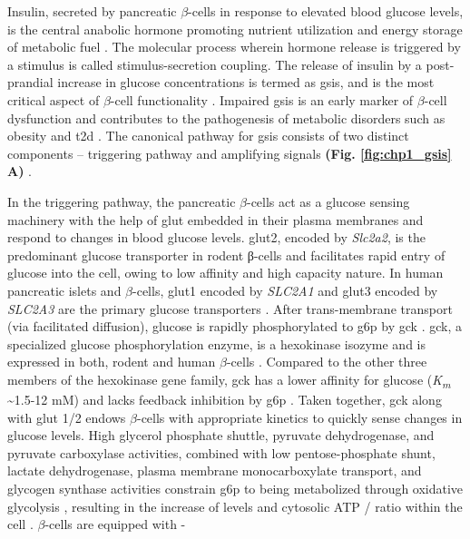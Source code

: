 Insulin, secreted by pancreatic $\beta$-cells in response to elevated blood glucose levels, is the central anabolic hormone promoting nutrient utilization and energy storage of metabolic fuel \textbf{\cite{slack_developmental_1995}}. The molecular process wherein hormone release is triggered by a stimulus is called stimulus-secretion coupling.  The release of insulin by a post-prandial increase in glucose concentrations is termed as \gls{gsis}, and is the most critical aspect of $\beta$-cell functionality \textbf{\cite{ashcroft_stimulussecretion_1994}}.  Impaired \gls{gsis} is an early marker of $\beta$-cell dysfunction and contributes to the pathogenesis of metabolic disorders such as obesity and \gls{t2d} \textbf{\cite{jensen_metabolic_2008}}. The canonical pathway for \gls{gsis} consists of two distinct components – triggering pathway and amplifying signals \textbf{(Fig. \ref{fig:chp1_gsis} A)} \textbf{\cite{henquin_triggering_2000}}. 
\\
\par In the triggering pathway, the pancreatic $\beta$-cells act as a glucose sensing machinery with the help of \gls{glut} embedded in their plasma membranes and respond to changes in blood glucose levels. \gls{glut}2, encoded by \textit{Slc2a2}, is the predominant glucose transporter in rodent β-cells \textbf{\cite{mcculloch_glut2_2011,van_de_bunt_tale_2012}} and facilitates rapid entry of glucose into the cell, owing to low affinity and high capacity nature. In human pancreatic islets and $\beta$-cells, \gls{glut}1 encoded by \textit{SLC2A1} and \gls{glut}3 encoded by \textit{SLC2A3} are the primary glucose transporters \textbf{\cite{mcculloch_glut2_2011}}. After trans-membrane transport (via facilitated diffusion), glucose is rapidly phosphorylated to \gls{g6p} by \gls{gck} \textbf{\cite{campbell_mechanisms_2021,matschinsky_central_2019}}. \gls{gck}, a specialized glucose phosphorylation enzyme, is a hexokinase isozyme and is expressed in both, rodent and human $\beta$-cells \textbf{\cite{campbell_mechanisms_2021}}. Compared to the other three members of the hexokinase gene family, \gls{gck} has a lower affinity for glucose (\textit{K\textsubscript{m}} \textasciitilde 1.5-12 mM) and lacks feedback inhibition by \gls{g6p} \textbf{\cite{matschinsky_central_2019}}. Taken together, \gls{gck} along with \gls{glut} 1/2 endows $\beta$-cells with appropriate kinetics to quickly sense changes in glucose levels. High glycerol phosphate shuttle, pyruvate dehydrogenase, and pyruvate carboxylase activities, combined with low pentose-phosphate shunt, lactate dehydrogenase, plasma membrane monocarboxylate transport, and glycogen synthase activities constrain \gls{g6p} to being metabolized through oxidative glycolysis \textbf{\cite{matschinsky_central_2019}}, resulting in the increase of  levels and cytosolic ATP /  ratio within the cell \textbf{\cite{henquin_triggering_2000}}. $\beta$-cells are equipped with -

